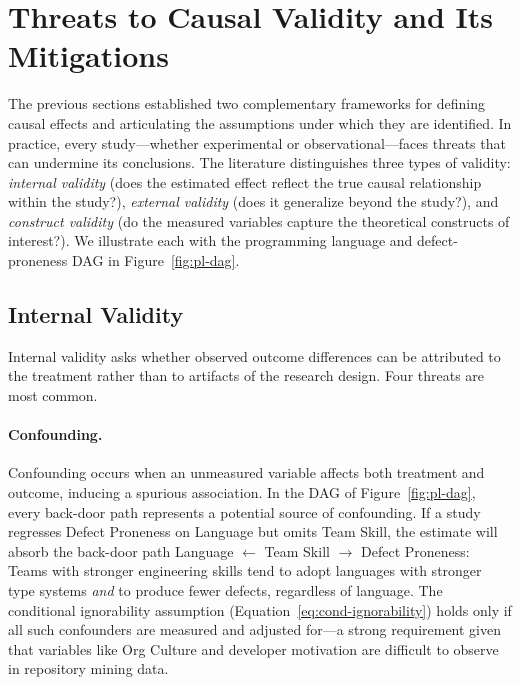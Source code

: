\section{Threats to Causal Validity and Its Mitigations}
\label{sec:threats}

The previous sections established two complementary frameworks for defining causal effects and articulating the assumptions under which they are identified.
In practice, every study---whether experimental or observational---faces threats that can undermine its conclusions.
The literature distinguishes three types of validity: \emph{internal validity} (does the estimated effect reflect the true causal relationship within the study?), \emph{external validity} (does it generalize beyond the study?), and \emph{construct validity} (do the measured variables capture the theoretical constructs of interest?).
We illustrate each with the programming language and defect-proneness DAG in Figure~\ref{fig:pl-dag}.

\subsection{Internal Validity}

Internal validity asks whether observed outcome differences can be attributed to the treatment rather than to artifacts of the research design.
Four threats are most common.

\paragraph{Confounding.}
Confounding occurs when an unmeasured variable affects both treatment and outcome, inducing a spurious association.
In the DAG of Figure~\ref{fig:pl-dag}, every back-door path represents a potential source of confounding.
If a study regresses Defect Proneness on Language but omits Team Skill, the estimate will absorb the back-door path Language $\leftarrow$ Team Skill $\to$ Defect Proneness: Teams with stronger engineering skills tend to adopt languages with stronger type systems \emph{and} to produce fewer defects, regardless of language.
The conditional ignorability assumption (Equation~\eqref{eq:cond-ignorability}) holds only if all such confounders are measured and adjusted for---a strong requirement given that variables like Org Culture and developer motivation are difficult to observe in repository mining data.


